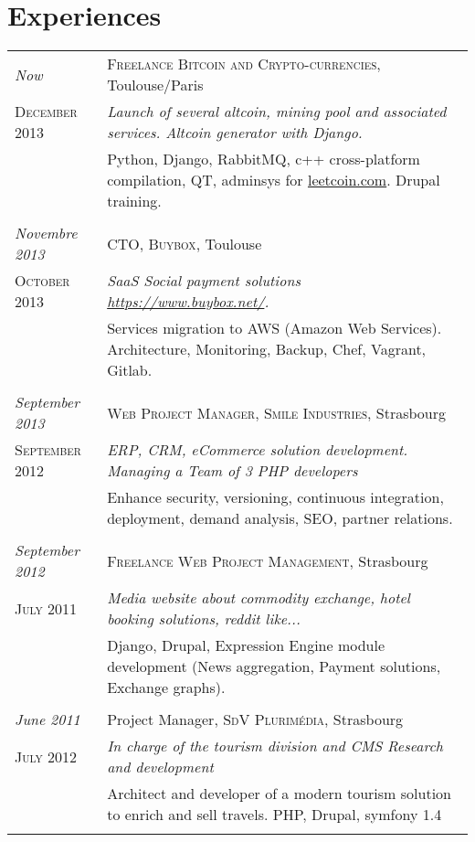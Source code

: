 \documentclass[a4paper,10pt]{article}
\begin{document}
\section{Experiences}
\begin{tabular}{p{}|p{}}	

	\emph{Now} & \textsc{Freelance Bitcoin and Crypto-currencies}, Toulouse/Paris \\\textsc{December 2013}&\emph{Launch of several altcoin, mining pool and associated services. Altcoin generator with Django.}\\&\footnotesize{Python, Django, RabbitMQ, c++ cross-platform compilation, QT, adminsys for \href{http://leetcoin.com}{leetcoin.com}. Drupal training.}\\\multicolumn{2}{c}{} \\

	\emph{Novembre 2013} & \textsc{CTO, Buybox}, Toulouse \\\textsc{October 2013}&\emph{SaaS Social payment solutions \href{https://www.buybox.net/}{https://www.buybox.net/}.}\\&\footnotesize{Services migration to AWS (Amazon Web Services). Architecture, Monitoring, Backup, Chef, Vagrant, Gitlab.}\\\multicolumn{2}{c}{} \\

	\emph{September 2013} & \textsc{Web Project Manager, Smile Industries}, Strasbourg \\\textsc{September 2012}&\emph{ERP, CRM, eCommerce solution development. Managing a Team of 3 PHP developers}\\&\footnotesize{Enhance security, versioning, continuous integration, deployment, demand analysis, SEO, partner relations.}\\\multicolumn{2}{c}{} \\

	\emph{September 2012} & \textsc{Freelance Web Project Management}, Strasbourg \\\textsc{July 2011}&\emph{Media website about commodity exchange, hotel booking solutions, reddit like...}\\&\footnotesize{Django, Drupal, Expression Engine module development (News aggregation, Payment solutions, Exchange graphs).}\\\multicolumn{2}{c}{} \\

  \emph{June 2011} & Project Manager, \textsc{SdV Plurimédia}, Strasbourg \\\textsc{July 2012}&\emph{ In charge of the tourism division and CMS Research and development  }\\&\footnotesize{Architect and developer of a modern tourism solution to enrich and sell travels. PHP, Drupal, symfony 1.4}\\\multicolumn{2}{c}{} \\
  

\end{tabular}
\end{document}
